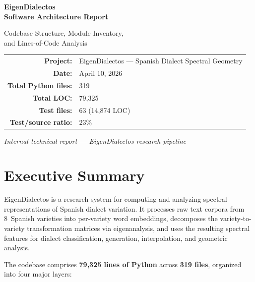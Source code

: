 \documentclass[11pt,a4paper]{article}
\begin{document}
\begin{titlepage}
\centering
\vspace*{3cm}
{\Huge\bfseries\color{blue!70!black} EigenDialectos\\[0.3em]
Software Architecture Report\par}
\vspace{1.5cm}
{\Large Codebase Structure, Module Inventory,\\
and Lines-of-Code Analysis\par}
\vspace{2cm}
{\large
\begin{tabular}{rl}
\textbf{Project:} & EigenDialectos --- Spanish Dialect Spectral Geometry \\
\textbf{Date:} & April 10, 2026 \\
\textbf{Total Python files:} & 319 \\
\textbf{Total LOC:} & 79{,}325 \\
\textbf{Test files:} & 63 (14{,}874 LOC) \\
\textbf{Test/source ratio:} & 23\% \\
\end{tabular}
\par}
\vspace{3cm}
{\small\textit{Internal technical report --- EigenDialectos research pipeline}}
\end{titlepage}

\tableofcontents
\newpage

\section{Executive Summary}

EigenDialectos is a research system for computing and analyzing spectral
representations of Spanish dialect variation. It processes raw text corpora from
8~Spanish varieties into per-variety word embeddings, decomposes the
variety-to-variety transformation matrices via eigenanalysis, and uses the resulting
spectral features for dialect classification, generation, interpolation, and
geometric analysis.

The codebase comprises \textbf{79{,}325 lines of Python} across \textbf{319 files},
organized into four major layers:
\end{document}
